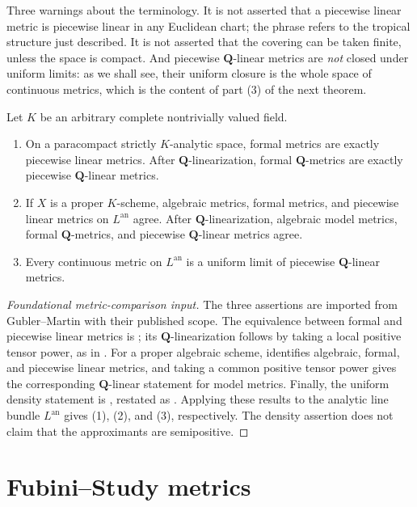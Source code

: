 Three warnings about the terminology. It is not asserted that a piecewise
linear metric is piecewise linear in any Euclidean chart; the phrase refers
to the tropical structure just described. It is not asserted that the
covering can be taken finite, unless the space is compact. And piecewise
$\mathbf Q$-linear metrics are \emph{not} closed under uniform limits: as
we shall see, their uniform closure is the whole space of continuous
metrics, which is the content of part (3) of the next theorem.

\begin{theorem}
\label{thm:gm-metric-comparison}
Let $K$ be an arbitrary complete nontrivially valued field.
\begin{enumerate}
\item On a paracompact strictly $K$-analytic space, formal metrics are
exactly piecewise linear metrics. After $\mathbf Q$-linearization, formal
$\mathbf Q$-metrics are exactly piecewise $\mathbf Q$-linear metrics.
\item If $X$ is a proper $K$-scheme, algebraic metrics, formal metrics,
and piecewise linear metrics on $L^{\mathrm{an}}$ agree. After
$\mathbf Q$-linearization, algebraic model metrics, formal
$\mathbf Q$-metrics, and piecewise $\mathbf Q$-linear metrics agree.
\item Every continuous metric on $L^{\mathrm{an}}$ is a uniform limit of
piecewise $\mathbf Q$-linear metrics.
\end{enumerate}
\end{theorem}
\begin{proof}[Foundational metric-comparison input]
The three assertions are imported from Gubler--Martin with their published
scope. The equivalence between formal and piecewise linear metrics is
\cite[Proposition~2.10]{GM19}; its $\mathbf Q$-linearization follows by
taking a local positive tensor power, as in
\cite[Definition~2.11]{GM19}. For a proper algebraic scheme,
\cite[Theorem~1.1]{GM19} identifies algebraic, formal, and piecewise linear
metrics, and taking a common positive tensor power gives the corresponding
$\mathbf Q$-linear statement for model metrics. Finally, the uniform density
statement is \cite[Theorem~1.2 and Proposition~2.15]{GM19}, restated as
\cite[Theorem~2.17]{GM19}. Applying these results to the analytic line
bundle $L^{\mathrm{an}}$ gives (1), (2), and (3), respectively. The
density assertion does not claim that the approximants are semipositive.
\end{proof}

\section{Fubini--Study metrics}
\label{sec:metrics-fs}

